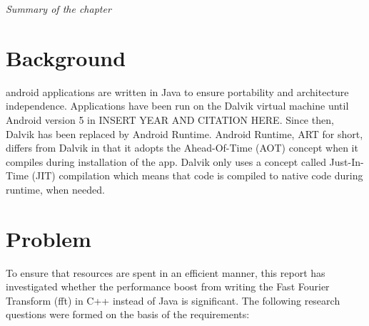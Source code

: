 
\textit{Summary of the chapter}


\section{Background}
\gls{android} applications are written in Java to ensure portability and architecture independence. Applications have been run on the Dalvik virtual machine until Android version 5\cite{android:dalvik} in INSERT YEAR AND CITATION HERE. Since then, Dalvik has been replaced by Android Runtime. Android Runtime, ART for short, differs from Dalvik in that it adopts the Ahead-Of-Time (AOT) concept when it compiles during installation of the app. Dalvik only uses a concept called Just-In-Time (JIT) compilation which means that code is compiled to native code during runtime, when needed.


\section{Problem}
To ensure that resources are spent in an efficient manner, this report has investigated whether the performance boost from writing the Fast Fourier Transform (\gls{fft}) in C++ instead of Java is significant. The following research questions were formed on the basis of the requirements:


